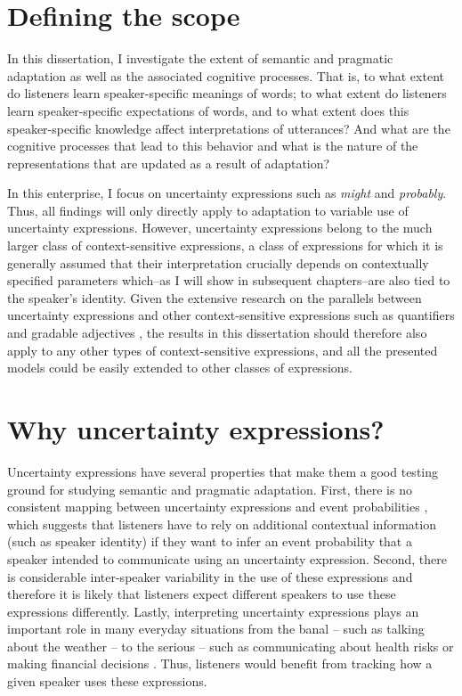 \section{Defining the scope}

In this dissertation, I investigate the extent of semantic and pragmatic adaptation as well as
the associated cognitive processes. That is, to what extent do listeners learn speaker-specific
meanings of words; to what extent do listeners learn speaker-specific expectations of words,
and to what extent does this speaker-specific knowledge affect interpretations of utterances? 
And what are the cognitive processes that lead to this behavior and what is the nature of the
representations that are updated as a result of adaptation?

In this enterprise, I focus on uncertainty expressions
such as \emph{might} and \emph{probably}. Thus, all findings will only directly apply to 
adaptation to variable use of uncertainty expressions. However, uncertainty expressions 
belong to the much larger class of context-sensitive expressions, a class of expressions for 
which it is generally assumed  that their interpretation crucially depends on contextually 
specified parameters which--as I will show in subsequent chapters--are
also tied to the speaker's identity. Given the extensive research on the parallels between
uncertainty expressions and other context-sensitive expressions such as quantifiers and
gradable adjectives \cite{Lassiter2016, Scholler2017}, the results in this dissertation
should therefore also apply to any other types of context-sensitive expressions, and all
the presented models could be easily extended to other classes of expressions. 

\section{Why uncertainty expressions?}
\label{sec:why-uncertainty-expressions}

Uncertainty expressions have several properties that make them a good testing ground for studying semantic and pragmatic
adaptation. First, there is no consistent mapping between uncertainty expressions and event probabilities , 
which suggests that listeners have to rely on additional contextual information (such as speaker identity)
if they want to infer an event probability that a speaker intended to communicate using an uncertainty expression. Second, there is considerable inter-speaker variability 
in the use of these expressions \cite{Wallsten1986} and therefore it is likely that listeners expect different speakers to use these expressions
differently. Lastly, interpreting uncertainty expressions plays an important role in many everyday situations from the banal -- 
such as talking about the weather -- to the serious -- such as communicating about health risks 
\cite{Berry2004, Lipkus2007, Politi2007} or making financial decisions \cite{Doupnik2003}. 
Thus, listeners would benefit from tracking  how a given speaker uses these expressions. 

